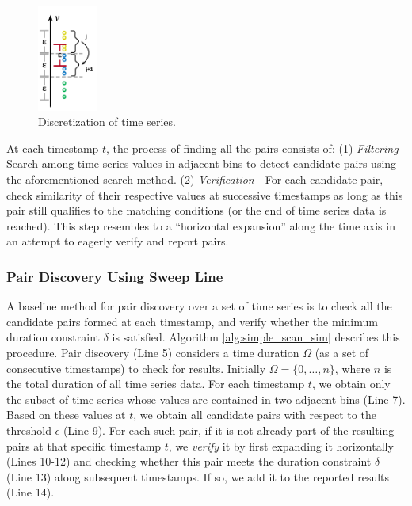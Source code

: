 \begin{figure}[!tb]
    \centering
    \includegraphics[width=0.175\textwidth]{figures/index.png}
    \caption{Discretization of time series.}
    \label{fig:index}
\end{figure}

At each timestamp $t$, the process of finding all the pairs consists of: (1) \textit{Filtering} - Search among time series values in adjacent bins to detect candidate pairs using the aforementioned search method. (2) \textit{Verification} - For each candidate pair, check similarity of their respective values at successive timestamps as long as this pair still qualifies to the matching conditions (or the end of time series data is reached). This step resembles to a ``horizontal expansion'' along the time axis in an attempt to eagerly verify and report pairs.

\subsubsection{Pair Discovery Using Sweep Line}
\label{subsec:sweep_line_join}
A baseline method for pair discovery over a set of time series is to check all the candidate pairs formed at each timestamp, and verify whether the minimum duration constraint $\delta$ is satisfied. Algorithm \ref{alg:simple_scan_sim} describes this procedure. Pair discovery (Line 5) considers a time duration $\Omega$ (as a set of consecutive timestamps) to check for results. Initially $\Omega = \{0, \dots, n\}$, where $n$ is the total duration of all time series data. For each timestamp $t$, we obtain only the subset of time series whose values are contained in two adjacent bins (Line 7). Based on these values at $t$, we obtain all candidate pairs with respect to the threshold $\epsilon$ (Line 9). For each such pair, if it is not already part of the resulting pairs at that specific timestamp $t$, we \textit{verify} it by first expanding it horizontally (Lines 10-12) and checking whether this pair meets the duration constraint $\delta$ (Line 13) along subsequent timestamps. If so, we add it to the reported results (Line 14).

